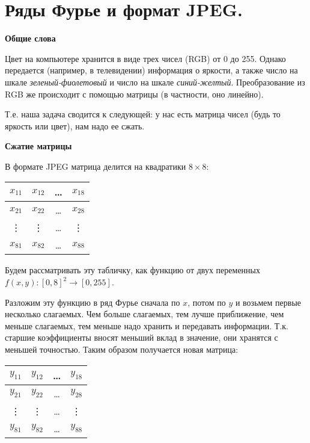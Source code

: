 \section{Ряды Фурье и формат JPEG.}

\textbf{Общие слова}

Цвет на компьютере хранится в виде трех чисел (RGB) от 0 до 255. Однако
передается (например, в телевидении) информация о яркости, а также число на
шкале \textit{зеленый-фиолетовый} и число на шкале \textit{синий-желтый}.
Преобразование из RGB же происходит с помощью матрицы (в частности, оно
линейно).

Т.е. наша задача сводится к следующей: у нас есть матрица чисел (будь то яркость или цвет), нам надо ее сжать.

\noindent\textbf{Сжатие матрицы}

В формате JPEG матрица делится на квадратики $8 \times 8$:
\vspace*{1.0em}

\begin{tabular}{|c|c|c|c|}
    \hline
    $x_{11}$ & $x_{12}$ & \ldots & $x_{18}$ \\
    \hline
    $x_{21}$ & $x_{22}$ & \ldots & $x_{28}$ \\
    \hline
    \vdots   & \vdots   & \ldots & \vdots   \\
    \hline
    $x_{81}$ & $x_{82}$ & \ldots & $x_{88}$ \\
    \hline
\end{tabular}
\vspace*{1.0em}

Будем рассматривать эту табличку, как функцию от двух переменных
$f(x, y)\colon [0, 8]^2 \to [0, 255]$.

Разложим эту функцию в ряд Фурье сначала по $x$, потом по $y$ и возьмем первые
несколько слагаемых. Чем больше слагаемых, тем лучше приближение, чем меньше
слагаемых, тем меньше надо хранить и передавать информации. Т.к. старшие
коэффициенты вносят меньший вклад в значение, они хранятся с меньшей точностью.
Таким образом получается новая матрица:

\vspace*{1.0em}
\begin{tabular}{|c|c|c|c|}
    \hline
    $y_{11}$ & $y_{12}$ & \ldots & $y_{18}$ \\
    \hline
    $y_{21}$ & $y_{22}$ & \ldots & $y_{28}$ \\
    \hline
    \vdots   & \vdots   & \ldots & \vdots   \\
    \hline
    $y_{81}$ & $y_{82}$ & \ldots & $y_{88}$ \\
    \hline
\end{tabular}

